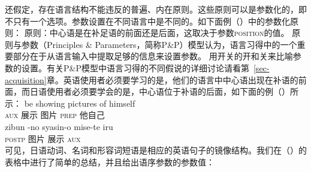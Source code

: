  \citet{Chomsky81a}还假定，存在语言结构不能违反的普遍、内在原则。这些原则可以是参数化的，即不只有一个选项。参数设置在不同语言中是不同的。如下面例（）中的参数化原则：
\ea
原则：中心语是在补足语的前面还是后面，这取决于参数\textsc{position}的值。
\z
原则与参数（Principles \& Parameters，简称P\&P）模型认为，语言习得中的一个重要部分在于从语言输入中提取足够的信息来设置参数。 \citet[]{Chomsky2000a-u}用开关的开和关来比喻参数的设置。有关P\&P模型中语言习得的不同假说的详细讨论请看第~\ref{sec-acquisition}章。英语使用者必须要学习的是，他们的语言中中心语出现在补语的前面，而日语使用者必须要学会的是，中心语位于补语的后面，如下面的例（）所示：
\eal
\label{Bsp-Kopfstellungsparameter}
\ex 
\gll be showing pictures of himself\\
     \textsc{aux} 展示 图片 \textsc{prep} 他自己\\
\ex
\gll zibun -no syasin-o mise-te iru\\
         \textsc{postp} 图片 展示 \textsc{aux}\\
\zl
可见，日语动词、名词和形容词短语是相应的英语句子的镜像结构。我们在（）的表格中进行了简单的总结，并且给出语序参数的参数值：
